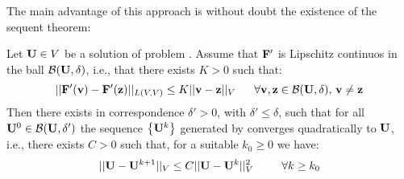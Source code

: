 
\vspace{0.1cm}

The main advantage of this approach is without doubt the existence of the sequent theorem:

\begin{Teorema}
\label{theorem: newton convergence}
Let  $\mathbf{U}\in V$ be a solution of problem . Assume that $\mathbf{F'}$ is Lipschitz continuos in the ball $\mathcal{B}(\mathbf{U},\delta)$, i.e., that there exists  $K>0$ such that:
\begin{equation}
||\vect{F'}(\vect{v})-\vect{F'}(\vect{z})||_{L(V,V)} \leq K ||\vect{v}-\vect{z}||_V \psp{10} \forall \vect{v},\vect{z} \in \mathcal{B}(\vect{U},\delta), \, \vect{v}\neq \vect{z}
\end{equation}
Then there exists in correspondence $\delta '>0$, with $\delta '\leq\delta$, such that for all $\mathbf{U}^0 \in \mathcal{B}(\mathbf{U},\delta ')$ the sequence $\left\{ \mathbf{U}^k \right\}$ generated by  converges quadratically to $\mathbf{U}$, i.e., there exists $C>0$ such that, for a suitable $k_0\geq 0$ we have:
\begin{equation}
\label{eq: convergece newton}
||\vect{U}-\vect{U}^{k+1}||_V\leq C||\vect{U}-\vect{U}^k||_V^2 \psp{15} \forall k\geq k_0
\end{equation}
\end{Teorema}

